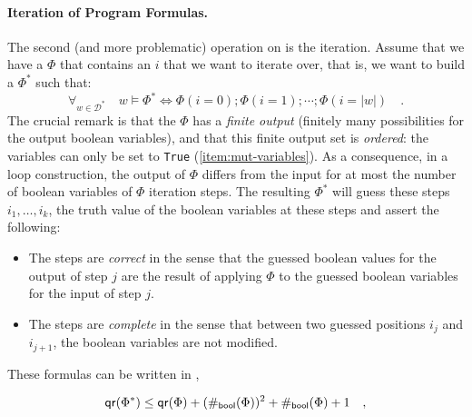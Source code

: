 \paragraph{Iteration of Program Formulas.} The second (and more problematic)
operation on  is the iteration. Assume that we have a
 $\Phi$ that contains an  $i$
that we want to iterate over, that is, we want to build a 
$\Phi^*$ such that:
\begin{equation*}
    \forall_{w \in \mathcal{D}^*}
    \quad 
    w \models
    \Phi^* 
    \iff 
    \Phi(i = 0) ; \Phi(i = 1) ; \cdots ; \Phi(i = |w|) \quad .
\end{equation*}
The crucial remark is that the  $\Phi$ has a \emph{finite
output} (finitely many possibilities for the output boolean variables), and
that this finite output set is \emph{ordered}: the variables can only be set to
\texttt{True} (\ref{item:mut-variables}). As a consequence, in a loop
construction, the output of $\Phi$ differs from the input for at most the
number of boolean variables of $\Phi$ iteration steps.
The resulting  $\Phi^*$ will guess these 
steps $i_1, \dots, i_k$, the truth value of the boolean variables at 
these steps and assert the following:
\begin{itemize}
    \item The steps are \emph{correct}  in the sense
        that the guessed boolean values for the output of step $j$
        are the result of applying $\Phi$ to the guessed boolean
        variables for the input of step $j$.
    \item The steps are \emph{complete} in the sense
        that between two guessed positions $i_j$ and $i_{j+1}$,
        the boolean variables are not modified.
\end{itemize}
These formulas can be written in ,

\begin{equation*}
    \mathop{\mathsf{qr}}(\Phi^*) 
    \leq \mathop{\mathsf{qr}}(\Phi) 
    + (\mathop{\#_\mathsf{bool}}(\Phi))^2
    + \mathop{\#_\mathsf{bool}}(\Phi)
    + 1 \quad ,
\end{equation*}
